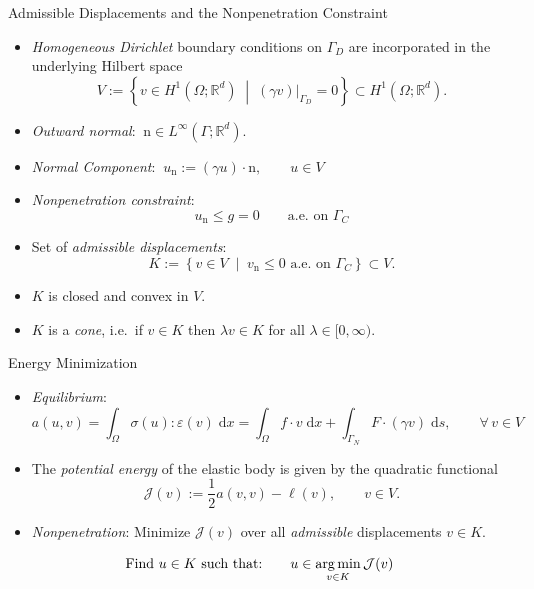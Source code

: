 \documentclass[10pt,aspectratio=169]{beamer}
\def\R{{\mathbb R}}
\def\cJ{{\mathcal J}}
\def\d{{\mathrm{d}}}
\def\dx{{\d x}}
\def\ds{{\d s}}
\newcommand{\argmin}{\operatornamewithlimits{arg\,min}}
\begin{document}
\begin{frame}{Admissible Displacements and the Nonpenetration Constraint}
	\begin{itemize}
		\item {\em Homogeneous Dirichlet} boundary conditions on $\Gamma_D$ are incorporated in the underlying Hilbert space
		      \begin{equation*}
			      V:=\left\{ v\in H^1(\Omega;\R^d)\;\middle|\; (\gamma v)|_{\Gamma_D}=0\right\}\subset H^1(\Omega;\R^d).
		      \end{equation*}
		\item {\em Outward normal}: $\ \mathrm{n}\in L^\infty(\Gamma;\R^d)$.
		\item {\em Normal Component}: $\ u_\mathrm{n}:= (\gamma u)\cdot \mathrm{n},\qquad u\in V$
		\item {\em Nonpenetration constraint}:
		      \begin{equation*}
			      u_\mathrm{n}\le g = 0\qquad\text{a.e. on }\Gamma_C
		      \end{equation*}
		\item Set of {\em admissible displacements}:
		      \begin{equation*}
			      K := \left\{ v\in V\;\middle|\; v_{\mathrm n}\le 0 \text{ a.e.\ on }\Gamma_C\right\}\subset V.
		      \end{equation*}
		\item $K$ is closed and convex in $V$.
		\item $K$ is a {\em cone}, i.e.\ if $v\in K$ then $\lambda v\in K$ for all $\lambda\in [0,\infty)$.
	\end{itemize}
\end{frame}

\begin{frame}{Energy Minimization}
	\begin{itemize}
		\item {\em Equilibrium}:
		      \begin{equation*}
			      a(u,v) = \int_\Omega \sigma(u):\varepsilon(v)\;\dx = \int_\Omega f\cdot v\;\dx +\int_{\Gamma_N} F\cdot(\gamma v)\;\ds,\qquad \forall\, v\in V
		      \end{equation*}
		\item The {\em potential energy} of the elastic body is given by the quadratic functional
		      \begin{equation*}
			      \cJ(v):= \frac{1}{2}a(v,v)-\ell(v),\qquad v\in V.
		      \end{equation*}
		\item {\em Nonpenetration}: Minimize $\cJ(v)$ over all {\em admissible} displacements $v\in K$.
	\end{itemize}

	\begin{problem}
	\begin{equation*}
		\text{Find }u\in K\text{ such that:}\qquad u\in \argmin_{v\in K}\cJ(v)
	\end{equation*}
	\end{problem}
\end{frame}
\end{document}
